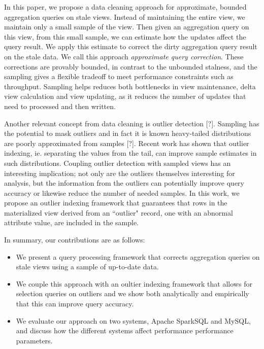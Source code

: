 In this paper, we propose a data cleaning approach for approximate,
bounded aggregation queries on stale views. Instead of maintaining
the entire view, we maintain only a small sample of the view. Then
given an aggregation query on this view, from this small sample, we
can estimate how the updates affect the query result. We apply this
estimate to correct the dirty aggregation query result on the stale
data. We call this approach \emph{approximate query correction}. 
These corrections are provably bounded, in contrast to the unbounded stalness,
and the sampling gives a flexible tradeoff to meet performance constraints such as throughput.
Sampling helps reduces both bottlenecks in view maintenance, delta
view calculation and view updating, as it reduces the number of updates
that need to processed and then written.

Another relevant concept from data cleaning is outlier detection {[}?{]}.
Sampling has the potential to mask outliers and in fact it is known
heavy-tailed distributions are poorly approximated from samples {[}?{]}.
Recent work has shown that outlier indexing, ie. separating the values
from the tail, can improve sample estimates in such distributions.
Coupling outlier detection with sampled views has an interesting implication;
not only are the outliers themselves interesting for analysis, but
the information from the outliers can potentially improve query accuracy
or likewise reduce the number of needed samples.
In this work, we propose an outlier indexing framework that guarantees that
rows in the materialized view derived from an ``outlier" record, one with
an abnormal attribute value, are included in the sample.

In summary, our contributions are as follows:
\begin{itemize}
\item We present a query processing framework that corrects aggregation queries on stale
views using a sample of up-to-date data.
\item We couple this approach with an oultier indexing framework that allows
for selection queries on outliers and we show both analytically and empirically that 
this can improve query accuracy.
\item We evaluate our approach on two systems, Apache SparkSQL and MySQL,
and discuss how the different systems affect performance performance
parameters.
\end{itemize}